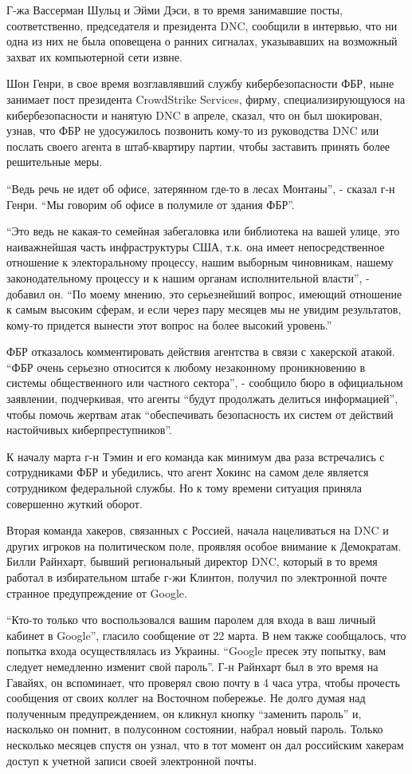 Г-жа Вассерман Шульц и Эйми Дэси, в то время занимавшие посты,
соответственно, председателя и президента DNC, сообщили в интервью, что
ни одна из них не была оповещена о ранних сигналах, указывавших на
возможный захват их компьютерной сети извне.

Шон Генри, в свое время возглавлявший службу кибербезопасности ФБР, ныне
занимает пост президента CrowdStrike Services, фирму, специализирующуюся
на кибербезопасности и нанятую DNC в апреле, сказал, что он был
шокирован, узнав, что ФБР не удосужилось позвонить кому-то из
руководства DNC или послать своего агента в штаб-квартиру партии, чтобы
заставить принять более решительные меры.

``Ведь речь не идет об офисе, затерянном где-то в лесах Монтаны'', -
сказал г-н Генри. ``Мы говорим об офисе в полумиле от здания ФБР''.

``Это ведь не какая-то семейная забегаловка или библиотека на вашей
улице, это наиважнейшая часть инфраструктуры США, т.к. она имеет
непосредственное отношение к электоральному процессу, нашим выборным
чиновникам, нашему законодательному процессу и к нашим органам
исполнительной власти'', - добавил он. ``По моему мнению, это
серьезнейший вопрос, имеющий отношение к самым высоким сферам, и если
через пару месяцев мы не увидим результатов, кому-то придется вынести
этот вопрос на более высокий уровень.''

ФБР отказалось комментировать действия агентства в связи с хакерской
атакой. ``ФБР очень серьезно относится к любому незаконному
проникновению в системы общественного или частного сектора'', - сообщило
бюро в официальном заявлении, подчеркивая, что агенты ``будут продолжать
делиться информацией'', чтобы помочь жертвам атак ``обеспечивать
безопасность их систем от действий настойчивых киберпреступников''.

К началу марта г-н Тэмин и его команда как минимум два раза встречались
с сотрудниками ФБР и убедились, что агент Хокинс на самом деле является
сотрудником федеральной службы. Но к тому времени ситуация приняла
совершенно жуткий оборот.

Вторая команда хакеров, связанных с Россией, начала нацеливаться на DNC
и других игроков на политическом поле, проявляя особое внимание к
Демократам. Билли Райнхарт, бывший региональный директор DNC, который в
то время работал в избирательном штабе г-жи Клинтон, получил по
электронной почте странное предупреждение от Google.

``Кто-то только что воспользовался вашим паролем для входа в ваш личный
кабинет в Google'', гласило сообщение от 22 марта. В нем также
сообщалось, что попытка входа осуществлялась из Украины. ``Google пресек
эту попытку, вам следует немедленно изменит свой пароль''. Г-н Райнхарт
был в это время на Гавайях, он вспоминает, что проверял свою почту в 4
часа утра, чтобы прочесть сообщения от своих коллег на Восточном
побережье. Не долго думая над полученным предупреждением, он кликнул
кнопку ``заменить пароль'' и, насколько он помнит, в полусонном
состоянии, набрал новый пароль. Только несколько месяцев спустя он
узнал, что в тот момент он дал российским хакерам доступ к учетной
записи своей электронной почты.

